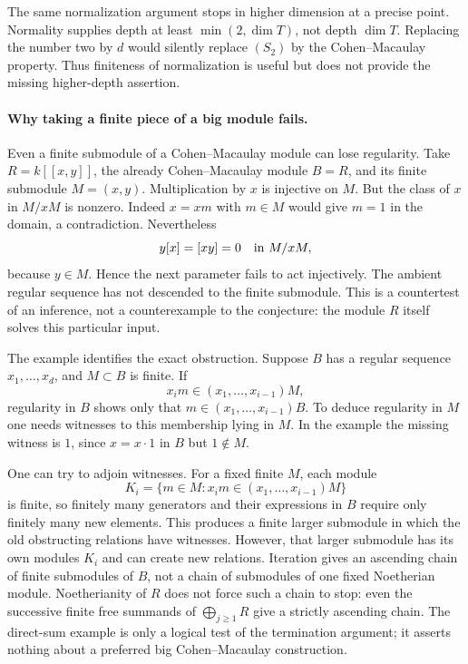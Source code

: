 \documentclass[11pt]{article}
\begin{document}
The same normalization argument stops in higher dimension at a precise
point. Normality supplies depth at least $\min(2,\dim T)$, not depth
$\dim T$. Replacing the number two by $d$ would silently replace
$(S_2)$ by the Cohen--Macaulay property. Thus finiteness of normalization
is useful but does not provide the missing higher-depth assertion.

\paragraph{Why taking a finite piece of a big module fails.}
Even a finite submodule of a Cohen--Macaulay module can lose regularity.
Take $R=k[[x,y]]$, the already Cohen--Macaulay module $B=R$, and its
finite submodule $M=(x,y)$. Multiplication by $x$ is injective on $M$.
But the class of $x$ in $M/xM$ is nonzero. Indeed $x=xm$ with $m\in M$
would give $m=1$ in the domain, a contradiction. Nevertheless
\[
 y[x]=[xy]=0\quad\hbox{in }M/xM,
\]
because $y\in M$. Hence the next parameter fails to act injectively.
The ambient regular sequence has not descended to the finite submodule.
This is a countertest of an inference, not a counterexample to the
conjecture: the module $R$ itself solves this particular input.

The example identifies the exact obstruction. Suppose $B$ has a regular
sequence $x_1,\ldots,x_d$, and $M\subset B$ is finite. If
\[
 x_i m\in(x_1,\ldots,x_{i-1})M,
\]
regularity in $B$ shows only that
$m\in(x_1,\ldots,x_{i-1})B$. To deduce regularity in $M$ one needs
witnesses to this membership lying in $M$. In the example the missing
witness is $1$, since $x=x\cdot1$ in $B$ but $1\notin M$.

One can try to adjoin witnesses. For a fixed finite $M$, each module
\[
 K_i=\{m\in M:x_i m\in(x_1,\ldots,x_{i-1})M\}
\]
is finite, so finitely many generators and their expressions in $B$
require only finitely many new elements. This produces a finite larger
submodule in which the old obstructing relations have witnesses.
However, that larger submodule has its own modules $K_i$ and can create
new relations. Iteration gives an ascending chain of finite submodules
of $B$, not a chain of submodules of one fixed Noetherian module.
Noetherianity of $R$ does not force such a chain to stop: even the
successive finite free summands of $\bigoplus_{j\ge1}R$ give a strictly
ascending chain. The direct-sum example is only a logical test of the
termination argument; it asserts nothing about a preferred big
Cohen--Macaulay construction.
\end{document}
